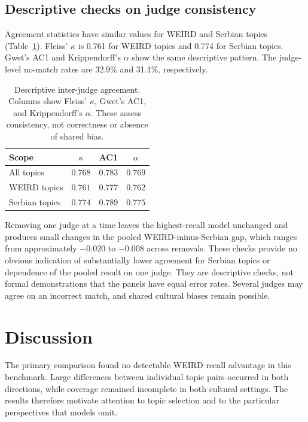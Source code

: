 \documentclass[11pt,a4paper]{article}
\begin{document}
\subsection{Descriptive checks on judge consistency}
\label{sec:judge-checks}
Agreement statistics have similar values for WEIRD and Serbian topics (Table~\ref{tab:judge-checks}). Fleiss' $\kappa$ is 0.761 for WEIRD topics and 0.774 for Serbian topics. Gwet's AC1 and Krippendorff's $\alpha$ show the same descriptive pattern. The judge-level no-match rates are 32.9\% and 31.1\%, respectively.

\begin{table}[!htbp]
\centering
\small
\caption{Descriptive inter-judge agreement. Columns show Fleiss' $\kappa$, Gwet's AC1, and Krippendorff's $\alpha$. These assess consistency, not correctness or absence of shared bias.}
\label{tab:judge-checks}
\begin{tabular*}{\columnwidth}{@{\extracolsep{\fill}}lccc@{}}
\toprule
Scope & $\kappa$ & AC1 & $\alpha$\\
\midrule
All topics & $0.768$ & $0.783$ & $0.769$\\
WEIRD topics & $0.761$ & $0.777$ & $0.762$\\
Serbian topics & $0.774$ & $0.789$ & $0.775$\\
\bottomrule
\end{tabular*}
\end{table}

Removing one judge at a time leaves the highest-recall model unchanged and produces small changes in the pooled WEIRD-minus-Serbian gap, which ranges from approximately $-0.020$ to $-0.008$ across removals. These checks provide no obvious indication of substantially lower agreement for Serbian topics or dependence of the pooled result on one judge. They are descriptive checks, not formal demonstrations that the panels have equal error rates. Several judges may agree on an incorrect match, and shared cultural biases remain possible.




\section{Discussion}
\label{sec:Discussion}
The primary comparison found no detectable WEIRD recall advantage in this benchmark. Large differences between individual topic pairs occurred in both directions, while coverage remained incomplete in both cultural settings. The results therefore motivate attention to topic selection and to the particular perspectives that models omit.
\end{document}

